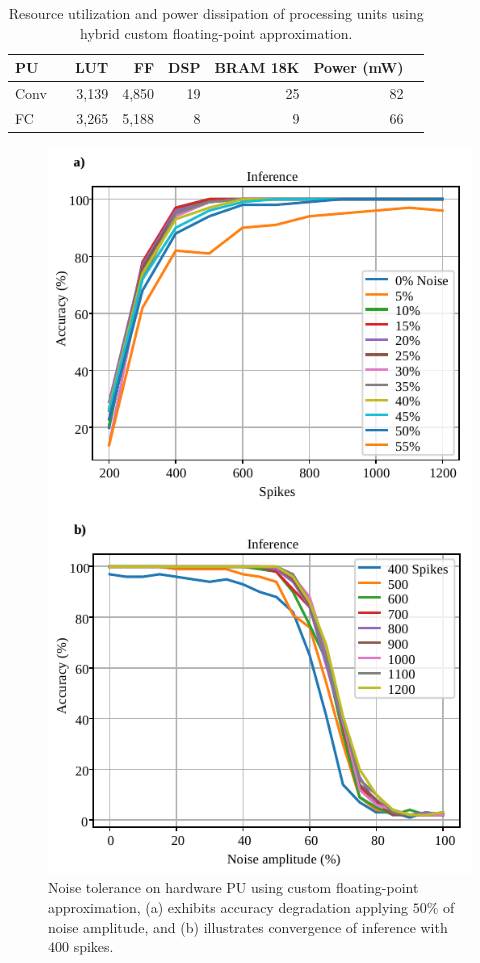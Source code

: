 \begin{table}[h!]\centering
	\caption{Resource utilization and power dissipation of processing units using hybrid custom floating-point approximation.}\label{tab:resource_cfp}
	\scriptsize
\begin{tabular}{lrrrrrrr}\toprule
	\textbf{PU} & &\textbf{LUT} &\textbf{FF} &\textbf{DSP} &\textbf{BRAM 18K} &\textbf{Power (mW)} \\\midrule
	Conv & &3,139 &4,850 &19 &25 &82 \\
	FC & &3,265 &5,188 &8 &9 &66 \\
	\bottomrule
\end{tabular}
\end{table}

\begin{figure}[h!]
	\centering
	\includegraphics[width=1\columnwidth]{../figures/accuracy_vs_noise_pu_cfp(4-bit-exponent_1-bit-mantissa).pdf}
	\caption{Noise tolerance on hardware PU using custom floating-point approximation, (a) exhibits accuracy degradation applying $50\%$ of noise amplitude, and (b) illustrates convergence of inference with $400$ spikes.}
	\label{fig:accuracy_vs_noise_pu_cfp}
\end{figure}

